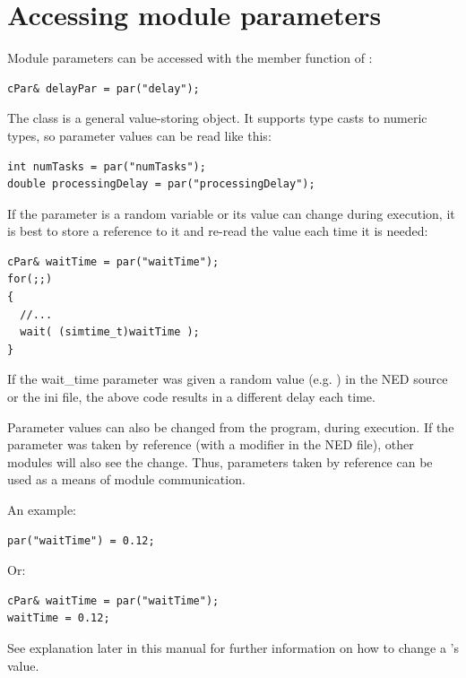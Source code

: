 \section{Accessing module parameters}
\label{ch:simple-modules:parameters}

Module parameters can be accessed
with the  member function of :

\begin{verbatim}
cPar& delayPar = par("delay");
\end{verbatim}

The  class is a general value-storing object. It supports
type casts to numeric types, so parameter values can be read
like this:

\begin{verbatim}
int numTasks = par("numTasks");
double processingDelay = par("processingDelay");
\end{verbatim}

If the parameter is a random variable or its value can change
during execution, it is best to store a reference to it and re-read
the value each time it is needed:

\begin{verbatim}
cPar& waitTime = par("waitTime");
for(;;)
{
  //...
  wait( (simtime_t)waitTime );
}
\end{verbatim}

If the wait\_time parameter was given a random value (e.g. )
in the NED source or the ini file, the above code results in
a different delay each time.

Parameter values can also be changed from the program, during
execution. If the parameter was taken by reference
 (with a
 modifier in the NED file), other modules
will also see the change.  Thus, parameters taken by reference can be
used as a means of module communication.


An example:

\begin{verbatim}
par("waitTime") = 0.12;
\end{verbatim}

Or:

\begin{verbatim}
cPar& waitTime = par("waitTime");
waitTime = 0.12;
\end{verbatim}


See  explanation later in this manual for further information
on how to change a 's value.


